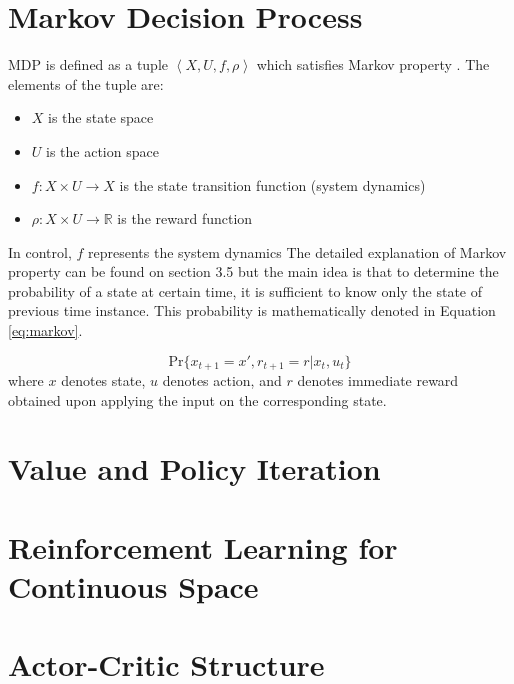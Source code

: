 \section{Markov Decision Process} \label{sec:mdp}
\ac{MDP} is defined as a tuple $\left<X, U, f, \rho \right>$ which satisfies Markov property \cite{babuskaRL}. The elements of the tuple are:
\begin{itemize}
	\item $X$ is the state space
	\item $U$ is the action space
	\item $f :X \times U \rightarrow X$ is the state transition function (system dynamics) 
	\item $\rho:X \times U \rightarrow \mathbb{R}$ is the reward function
\end{itemize}

In control, $f$ represents the system dynamics 
The detailed explanation of Markov property can be found on \cite{sutton1998reinforcement} section 3.5 but the main idea is that to determine the probability of a state at certain time, it is sufficient to know only the state of previous time instance. This probability is mathematically denoted in Equation \eqref{eq:markov}.

\begin{equation}
	\text{Pr}\{x_{t+1} = x', r_{t+1} = r| x_t, u_t \}
	\label{eq:markov}
\end{equation}
where $x$ denotes state, $u$ denotes action, and $r$ denotes immediate reward obtained upon applying the input on the corresponding state.

\section{Value and Policy Iteration} \label{sec:value_iter}

\section{Reinforcement Learning for Continuous Space}


\section{Actor-Critic Structure} \label{sec:actor}
